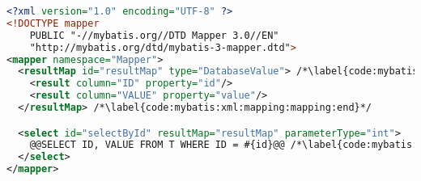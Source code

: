 
\begin{lstlisting}[language=XML, morekeywords={mapper,resultMap,result,select}, caption={MyBatis XML mapper definition}, label={code:mybatis:xml:mapping}]
<?xml version="1.0" encoding="UTF-8" ?>
<!DOCTYPE mapper
    PUBLIC "-//mybatis.org//DTD Mapper 3.0//EN"
    "http://mybatis.org/dtd/mybatis-3-mapper.dtd">
<mapper namespace="Mapper">
  <resultMap id="resultMap" type="DatabaseValue"> /*\label{code:mybatis:xml:mapping:mapping:begin}*/
    <result column="ID" property="id"/>
    <result column="VALUE" property="value"/>
  </resultMap> /*\label{code:mybatis:xml:mapping:mapping:end}*/

  <select id="selectById" resultMap="resultMap" parameterType="int">
    @@SELECT ID, VALUE FROM T WHERE ID = #{id}@@ /*\label{code:mybatis:xml:mapping:query}*/
  </select>
</mapper>
\end{lstlisting}
